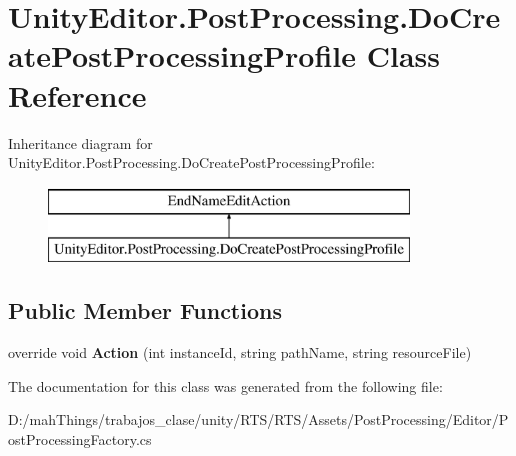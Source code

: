 \hypertarget{class_unity_editor_1_1_post_processing_1_1_do_create_post_processing_profile}{}\section{Unity\+Editor.\+Post\+Processing.\+Do\+Create\+Post\+Processing\+Profile Class Reference}
\label{class_unity_editor_1_1_post_processing_1_1_do_create_post_processing_profile}
Inheritance diagram for Unity\+Editor.\+Post\+Processing.\+Do\+Create\+Post\+Processing\+Profile\+:\begin{figure}[H]
\begin{center}
\leavevmode
\includegraphics[height=2.000000cm]{class_unity_editor_1_1_post_processing_1_1_do_create_post_processing_profile}
\end{center}
\end{figure}
\subsection*{Public Member Functions}
\begin{DoxyCompactItemize}
\item 
\mbox{\label{class_unity_editor_1_1_post_processing_1_1_do_create_post_processing_profile_ab5f81f0dce2a8bf886642315e22efd83}} 
override void {\bfseries Action} (int instance\+Id, string path\+Name, string resource\+File)
\end{DoxyCompactItemize}


The documentation for this class was generated from the following file\+:\begin{DoxyCompactItemize}
\item 
D\+:/mah\+Things/trabajos\+\_\+clase/unity/\+R\+T\+S/\+R\+T\+S/\+Assets/\+Post\+Processing/\+Editor/Post\+Processing\+Factory.\+cs\end{DoxyCompactItemize}
